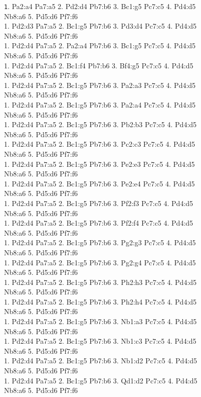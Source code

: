 \documentclass[conference]{IEEEtran}
\newenvironment{mytinylisting}
{\begin{list}{}{\setlength{\leftmargin}{1em}}\item\scriptsize\texttt}
{\end{list}}
\begin{document}
\begin{figure}
\begin{mytinylisting}
1. Pa2:a4 Pa7:a5 2. Pd2:d4 Pb7:b6 3. Bc1:g5 Pc7:c5 4. Pd4:d5 Nb8:a6 5. Pd5:d6 Pf7:f6 \\
1. Pd2:d3 Pa7:a5 2. Bc1:g5 Pb7:b6 3. Pd3:d4 Pc7:c5 4. Pd4:d5 Nb8:a6 5. Pd5:d6 Pf7:f6 \\
1. Pd2:d4 Pa7:a5 2. Pa2:a4 Pb7:b6 3. Bc1:g5 Pc7:c5 4. Pd4:d5 Nb8:a6 5. Pd5:d6 Pf7:f6 \\
1. Pd2:d4 Pa7:a5 2. Bc1:f4 Pb7:b6 3. Bf4:g5 Pc7:c5 4. Pd4:d5 Nb8:a6 5. Pd5:d6 Pf7:f6 \\
1. Pd2:d4 Pa7:a5 2. Bc1:g5 Pb7:b6 3. Pa2:a3 Pc7:c5 4. Pd4:d5 Nb8:a6 5. Pd5:d6 Pf7:f6 \\
1. Pd2:d4 Pa7:a5 2. Bc1:g5 Pb7:b6 3. Pa2:a4 Pc7:c5 4. Pd4:d5 Nb8:a6 5. Pd5:d6 Pf7:f6 \\
1. Pd2:d4 Pa7:a5 2. Bc1:g5 Pb7:b6 3. Pb2:b3 Pc7:c5 4. Pd4:d5 Nb8:a6 5. Pd5:d6 Pf7:f6 \\
1. Pd2:d4 Pa7:a5 2. Bc1:g5 Pb7:b6 3. Pc2:c3 Pc7:c5 4. Pd4:d5 Nb8:a6 5. Pd5:d6 Pf7:f6 \\
1. Pd2:d4 Pa7:a5 2. Bc1:g5 Pb7:b6 3. Pe2:e3 Pc7:c5 4. Pd4:d5 Nb8:a6 5. Pd5:d6 Pf7:f6 \\
1. Pd2:d4 Pa7:a5 2. Bc1:g5 Pb7:b6 3. Pe2:e4 Pc7:c5 4. Pd4:d5 Nb8:a6 5. Pd5:d6 Pf7:f6 \\
1. Pd2:d4 Pa7:a5 2. Bc1:g5 Pb7:b6 3. Pf2:f3 Pc7:c5 4. Pd4:d5 Nb8:a6 5. Pd5:d6 Pf7:f6 \\
1. Pd2:d4 Pa7:a5 2. Bc1:g5 Pb7:b6 3. Pf2:f4 Pc7:c5 4. Pd4:d5 Nb8:a6 5. Pd5:d6 Pf7:f6 \\
1. Pd2:d4 Pa7:a5 2. Bc1:g5 Pb7:b6 3. Pg2:g3 Pc7:c5 4. Pd4:d5 Nb8:a6 5. Pd5:d6 Pf7:f6 \\
1. Pd2:d4 Pa7:a5 2. Bc1:g5 Pb7:b6 3. Pg2:g4 Pc7:c5 4. Pd4:d5 Nb8:a6 5. Pd5:d6 Pf7:f6 \\
1. Pd2:d4 Pa7:a5 2. Bc1:g5 Pb7:b6 3. Ph2:h3 Pc7:c5 4. Pd4:d5 Nb8:a6 5. Pd5:d6 Pf7:f6 \\
1. Pd2:d4 Pa7:a5 2. Bc1:g5 Pb7:b6 3. Ph2:h4 Pc7:c5 4. Pd4:d5 Nb8:a6 5. Pd5:d6 Pf7:f6 \\
1. Pd2:d4 Pa7:a5 2. Bc1:g5 Pb7:b6 3. Nb1:a3 Pc7:c5 4. Pd4:d5 Nb8:a6 5. Pd5:d6 Pf7:f6 \\
1. Pd2:d4 Pa7:a5 2. Bc1:g5 Pb7:b6 3. Nb1:c3 Pc7:c5 4. Pd4:d5 Nb8:a6 5. Pd5:d6 Pf7:f6 \\
1. Pd2:d4 Pa7:a5 2. Bc1:g5 Pb7:b6 3. Nb1:d2 Pc7:c5 4. Pd4:d5 Nb8:a6 5. Pd5:d6 Pf7:f6 \\
1. Pd2:d4 Pa7:a5 2. Bc1:g5 Pb7:b6 3. Qd1:d2 Pc7:c5 4. Pd4:d5 Nb8:a6 5. Pd5:d6 Pf7:f6 \\

\end{mytinylisting}
\end{figure}
\end{document}
